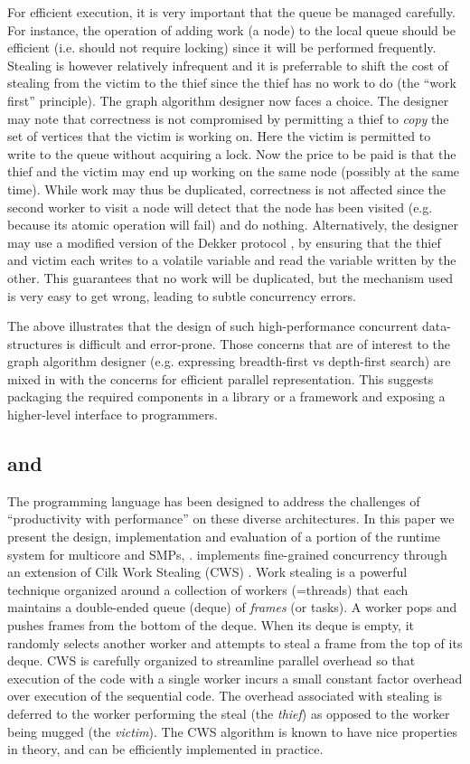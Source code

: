 For efficient execution, it is very important that the queue be
managed carefully. For instance, the operation of adding work (a node)
to the local queue should be efficient (i.e.{} should not require
locking) since it will be performed frequently. Stealing is however
relatively infrequent and it is preferrable to shift the cost of
stealing from the victim to the thief since the thief has no work to
do (the ``work first'' principle). The graph algorithm designer now
faces a choice. The designer may note \cite{BC04a} that correctness is
not compromised by permitting a thief to {\em copy} the set of vertices
that the victim is working on. Here the victim is permitted to write
to the queue without acquiring a lock. Now the price to be paid is
that the thief and the victim may end up working on the same node
(possibly at the same time).  While work may thus be duplicated,
correctness is not affected since the second worker to visit a node
will detect that the node has been visited (e.g.{} because its atomic
operation will fail) and do nothing. Alternatively, the designer may
use a modified version of the Dekker protocol \cite{BJKLRZ95}, by ensuring
that the thief and victim each writes to a volatile variable and read
the variable written by the other. This guarantees that no work will
be duplicated, but the mechanism used is very easy to get wrong,
leading to subtle concurrency errors.

The above illustrates that the design of such high-performance
concurrent data-structures is difficult and error-prone. Those
concerns that are of interest to the graph algorithm designer (e.g.{}
expressing breadth-first vs depth-first search) are mixed in with the
concerns for efficient parallel representation.  This suggests
packaging the required components in a library or a framework and
exposing a higher-level interface to programmers.

\subsection{\Xten{} and \XWS}
The \Xten{} programming language \cite{x10} has
been designed to address the challenges of ``productivity with
performance'' on these diverse architectures.  In this paper we
present the design, implementation and evaluation of a portion of the
\Xten{} runtime system for multicore and SMPs, \XWS{}. \XWS{}
implements fine-grained concurrency through an extension of Cilk Work
Stealing (CWS) \cite{BJKLRZ95}.  Work stealing is a powerful technique
organized around a collection of workers (=threads) that each
maintains a double-ended queue (deque) of {\em frames} (or tasks). A
worker pops and pushes frames from the bottom of the deque. When its
deque is empty, it randomly selects another worker and attempts to
steal a frame from the top of its deque. CWS is carefully organized to
streamline parallel overhead so that execution of the code with a
single worker incurs a small constant factor overhead over execution
of the sequential code. The overhead associated with stealing is
deferred to the worker performing the steal (the {\em thief}) as
opposed to the worker being mugged (the {\em victim}). The CWS
algorithm is known to have nice properties in theory, and can be
efficiently implemented in practice.

